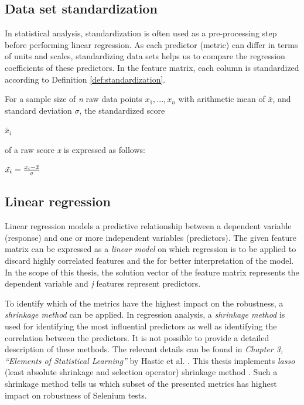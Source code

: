 \subsection*{Data set standardization}
In statistical analysis, standardization is often used as a pre-processing step before performing linear regression. As each predictor (metric) can differ in terms of units and scales, standardizing data sets helps us to compare the regression coefficients of these predictors. In the feature matrix, each column is standardized according to Definition \ref{def:standardization}.

\theoremstyle{definition}
\begin{definition}{For a sample size of \textit{n} raw data points \textit{$x_1,...,x_n$} with arithmetic mean of $\bar{x}$, and standard deviation $\sigma$, the standardized score \begin{large}
$\tilde{x_{i}}$
\end{large} of a raw score \textit{x} is expressed as follows: }
\begin{center}\Large
$\begin{tiny}
\tilde{x_{i}}
\end{tiny} = {x_{i}- \bar{x} \over \sigma}$
\label{def:standardization}
\end{center}
\end{definition}

\subsection*{Linear regression}

Linear regression models a predictive relationship between a dependent variable (response) and one or more independent variables (predictors). The given feature matrix can be expressed as a \textit{linear model} on which regression is to be applied to discard highly correlated features and the for better interpretation of the model. In the scope of this thesis, the solution vector of the feature matrix represents the dependent variable and \textit{j} features represent predictors. 

To identify which of the metrics have the highest impact on the robustness, a \textit{shrinkage method} can be applied. In regression analysis, a \textit{shrinkage method} is used for identifying the most influential predictors as well as identifying the correlation between the predictors. It is not possible to provide a detailed description of these methods. The relevant details can be found in \textit{Chapter 3, ``Elements of Statistical Learning''} by Hastie et al. \cite{hastie01statisticallearning}. This thesis implements \textit{lasso} (least absolute shrinkage and selection operator) shrinkage method \cite{tibshirani1996regression}. Such a shrinkage method tells us which subset of the presented metrics has highest impact on robustness of Selenium tests.

